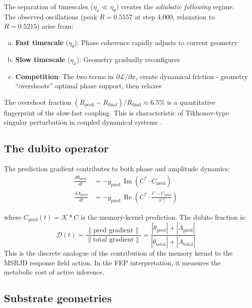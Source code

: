 \documentclass[12pt,a4paper]{article}
\theoremstyle{plain}
\theoremstyle{definition}
\begin{document}
The separation of timescales ($\eta_x \ll \eta_\theta$) creates the
\emph{adiabatic following} regime. The observed oscillations (peak
$R = 0.5557$ at step 4,000, relaxation to $R = 0.5215$) arise from:
\begin{enumerate}[(a)]
  \item \textbf{Fast timescale} ($\eta_\theta$): Phase coherence rapidly
        adjusts to current geometry
  \item \textbf{Slow timescale} ($\eta_x$): Geometry gradually reconfigures
  \item \textbf{Competition}: The two terms in
        $\partial\mathcal{L}/\partial x_i$ create dynamical friction -
        geometry ``overshoots'' optimal phase support, then relaxes
\end{enumerate}
The overshoot fraction
$(R_{\text{peak}} - R_{\text{final}})/R_{\text{final}} \approx 6.5\%$
is a quantitative fingerprint of the slow-fast coupling. This is
characteristic of Tikhonov-type singular perturbation in coupled dynamical
systems \citep{tikhonov1952}.

\newpage
\subsection{The dubito operator}

The prediction gradient contributes to both phase and amplitude dynamics:
\begin{align}
\frac{d\theta_{\text{pred}}}{dt}
  &= -g_{\text{pred}}\,\operatorname{Im}(C^* \cdot C_{\text{pred}}) \\
\frac{dA_{\text{pred}}}{dt}
  &= -g_{\text{pred}}\,\operatorname{Re}\!\left(C^* \cdot
     \frac{C - C_{\text{pred}}}{|C|}\right)
\end{align}

where $C_{\text{pred}}(t) = \mathcal{K} * C$ is the memory-kernel
prediction. The dubito fraction is:
\begin{equation}
\mathcal{D}(t)
  = \frac{\|\text{pred gradient}\|}{\|\text{total gradient}\|}
  = \frac{|\dot\theta_{\text{pred}}| + |\dot A_{\text{pred}}|}
         {|\dot\theta_{\text{total}}| + |\dot A_{\text{total}}|}
\end{equation}
This is the discrete analogue of the contribution of the memory kernel
to the MSRJD response field action. In the FEP interpretation, it
measures the metabolic cost of active inference.

\subsection{Substrate geometries}
\end{document}
